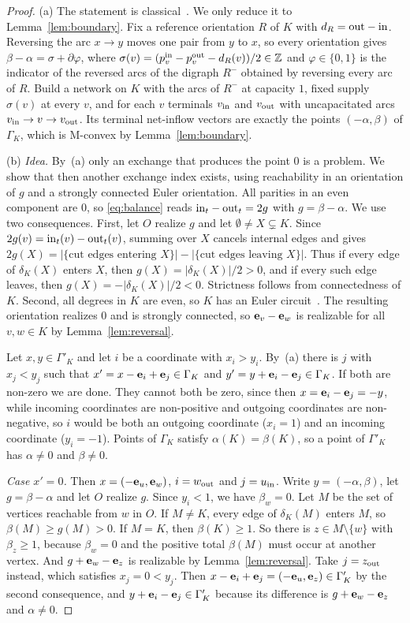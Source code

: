 \begin{proof}
(a) The statement is classical~\cite{hakimi1965,frank1980,frank2011}. We only reduce it to Lemma~\ref{lem:boundary}. Fix a reference orientation $R$ of $K$ with $d_R=\mathrm{out}-\mathrm{in}$. Reversing the arc $x\to y$ moves one pair from $y$ to $x$, so every orientation gives $\beta-\alpha=\sigma+\partial\varphi$, where $\sigma(v)=(p^{\mathrm{in}}_v-p^{\mathrm{out}}_v-d_R(v))/2\in\mathbb{Z}$ and $\varphi\in\{0,1\}$ is the indicator of the reversed arcs of the digraph $R^-$ obtained by reversing every arc of $R$. Build a network on $K$ with the arcs of $R^-$ at capacity $1$, fixed supply $\sigma(v)$ at every $v$, and for each $v$ terminals $v_{\mathrm{in}}$ and $v_{\mathrm{out}}$ with uncapacitated arcs $v_{\mathrm{in}}\to v\to v_{\mathrm{out}}$. Its terminal net-inflow vectors are exactly the points $(-\alpha,\beta)$ of $\Gamma_K$, which is M-convex by Lemma~\ref{lem:boundary}.

(b) \emph{Idea.} By~(a) only an exchange that produces the point $0$ is a problem. We show that then another exchange index exists, using reachability in an orientation of $g$ and a strongly connected Euler orientation. All parities in an even component are $0$, so \eqref{eq:balance} reads $\mathrm{in}_t-\mathrm{out}_t=2g$ with $g=\beta-\alpha$. We use two consequences. First, let $O$ realize $g$ and let $\emptyset\ne X\subsetneq K$. Since $2g(v)=\mathrm{in}_t(v)-\mathrm{out}_t(v)$, summing over $X$ cancels internal edges and gives $2g(X)=|\{\text{cut edges entering }X\}|-|\{\text{cut edges leaving }X\}|$. Thus if every edge of $\delta_K(X)$ enters $X$, then $g(X)=|\delta_K(X)|/2>0$, and if every such edge leaves, then $g(X)=-|\delta_K(X)|/2<0$. Strictness follows from connectedness of $K$. Second, all degrees in $K$ are even, so $K$ has an Euler circuit~\cite{hierholzer1873}. The resulting orientation realizes $0$ and is strongly connected, so $\mathbf{e}_v-\mathbf{e}_w$ is realizable for all $v,w\in K$ by Lemma~\ref{lem:reversal}.

Let $x,y\in\Gamma'_K$ and let $i$ be a coordinate with $x_i>y_i$. By~(a) there is $j$ with $x_j<y_j$ such that $x'=x-\mathbf{e}_i+\mathbf{e}_j\in\Gamma_K$ and $y'=y+\mathbf{e}_i-\mathbf{e}_j\in\Gamma_K$. If both are non-zero we are done. They cannot both be zero, since then $x=\mathbf{e}_i-\mathbf{e}_j=-y$, while incoming coordinates are non-positive and outgoing coordinates are non-negative, so $i$ would be both an outgoing coordinate ($x_i=1$) and an incoming coordinate ($y_i=-1$). Points of $\Gamma_K$ satisfy $\alpha(K)=\beta(K)$, so a point of $\Gamma'_K$ has $\alpha\ne0$ and $\beta\ne0$.

\emph{Case $x'=0$.} Then $x=(-\mathbf{e}_u,\mathbf{e}_w)$, $i=w_{\mathrm{out}}$ and $j=u_{\mathrm{in}}$. Write $y=(-\alpha,\beta)$, let $g=\beta-\alpha$ and let $O$ realize $g$. Since $y_i<1$, we have $\beta_w=0$. Let $M$ be the set of vertices reachable from $w$ in $O$. If $M\ne K$, every edge of $\delta_K(M)$ enters $M$, so $\beta(M)\ge g(M)>0$. If $M=K$, then $\beta(K)\ge1$. So there is $z\in M\setminus\{w\}$ with $\beta_z\ge1$, because $\beta_w=0$ and the positive total $\beta(M)$ must occur at another vertex. And $g+\mathbf{e}_w-\mathbf{e}_z$ is realizable by Lemma~\ref{lem:reversal}. Take $j=z_{\mathrm{out}}$ instead, which satisfies $x_j=0<y_j$. Then $x-\mathbf{e}_i+\mathbf{e}_j=(-\mathbf{e}_u,\mathbf{e}_z)\in\Gamma'_K$ by the second consequence, and $y+\mathbf{e}_i-\mathbf{e}_j\in\Gamma'_K$ because its difference is $g+\mathbf{e}_w-\mathbf{e}_z$ and $\alpha\ne0$.


\end{proof}
